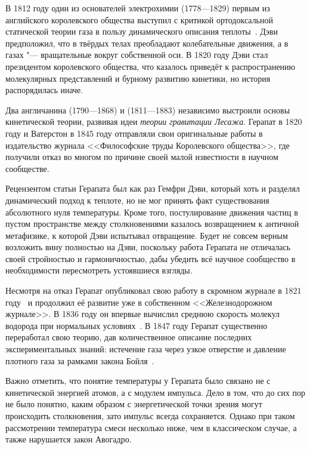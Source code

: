 \documentclass[a4paper, 12pt, oneside]{article} %
\begin{document}
В 1812 году один из основателей электрохимии 
(1778---1829) первым из английского королевского общества выступил с
критикой ортодоксальной статической теории газа в пользу динамического
описания теплоты~\cite{davy1812elements}. Дэви предположил, что в
твёрдых телах преобладают колебательные движения, а в газах "---
вращательные вокруг собственной оси. В 1820 году Дэви стал президентом
королевского общества, что казалось приведёт к распространению
молекулярных представлений и бурному развитию кинетики, но история
распорядилась иначе.

Два англичанина  (1790---1868) и  (1811---1883) независимо выстроили основы кинетической теории,
развивая идеи \emph{теории гравитации Лесажа}. Герапат в 1820 году и Ватерстон в
1845 году отправляли свои оригинальные работы в издательство журнала
<<Философские труды Королевского общества>>, где получили отказ во
многом по причине своей малой известности в научном сообществе.

Рецензентом статьи Герапата был как раз Гемфри Дэви, который хоть и
разделял динамический подход к теплоте, но не мог принять факт
существования абсолютного нуля температуры. Кроме того, постулирование
движения частиц в пустом пространстве между столкновениями казалось
возвращением к античной метафизике, к которой Дэви испытывал отвращение.
Будет не совсем верным возложить вину полностью на Дэви, поскольку
работа Герапата не отличалась своей стройностью и гармоничностью, дабы
убедить всё научное сообщество в необходимости пересмотреть устоявшиеся
взгляды.

Несмотря на отказ Герапат опубликовал свою работу в скромном журнале в
1821 году~\cite{herapath1821mathematical} и продолжил её развитие уже в
собственном <<Железнодорожном журнале>>. В 1836 году он впервые вычислил
среднюю скорость молекул водорода при нормальных
условиях~\cite{herapath1836principles}. В
1847 году Герапат существенно переработал свою теорию, дав
количественное описание последних экспериментальных знаний: истечение
газа через узкое отверстие и давление плотного газа за рамками закона
Бойля~\cite{herapath1847mathematical}.

Важно отметить, что понятие температуры у Герапата было связано не с
кинетической энергией атомов, а с модулем импульса. Дело в том, что до
сих пор не было понятно, каким образом с энергетической точки зрения
могут происходить столкновения, зато импульс всегда сохраняется. Однако
при таком рассмотрении температура смеси несколько ниже, чем
в классическом случае, а также нарушается закон Авогадро.
\end{document}
